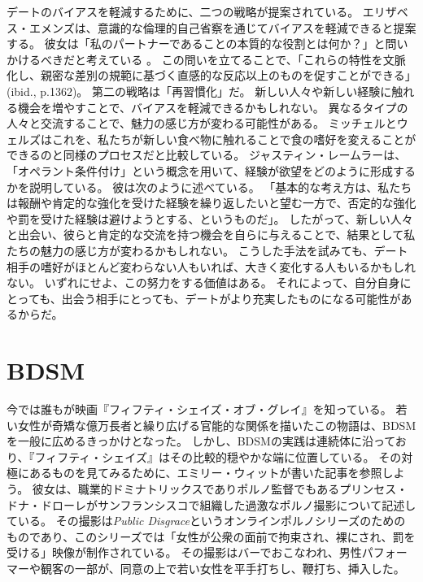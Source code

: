 \documentclass[paper=a4,book,openany]{jlreq}
\newcommand{\ig}[1]{}           %
\begin{document}
デートのバイアスを軽減するために、二つの戦略が提案されている。
エリザベス・エメンズは、意識的な倫理的自己省察を通じてバイアスを軽減できると提案する。
彼女は「私のパートナーであることの本質的な役割とは何か？」と問いかけるべきだと考えている \citep[p.1360]{emens09:_intim_discr}。
この問いを立てることで、「これらの特性を文脈化し、親密な差別の規範に基づく直感的な反応以上のものを促すことができる」(ibid., p.1362)。
第二の戦略は「再習慣化」だ。
新しい人々や新しい経験に触れる機会を増やすことで、バイアスを軽減できるかもしれない。
異なるタイプの人々と交流することで、魅力の感じ方が変わる可能性がある。
ミッチェル\ig{Megan Mitchell}とウェルズはこれを、私たちが新しい食べ物に触れることで食の嗜好を変えることができるのと同様のプロセスだと比較している\citep{mitchell18:_race_roman_attrac_datin}。
ジャスティン・レームラーは、「オペラント条件付け」という概念を用いて、経験が欲望をどのように形成するかを説明している。
彼は次のように述べている。
「基本的な考え方は、私たちは報酬や肯定的な強化を受けた経験を繰り返したいと望む一方で、否定的な強化や罰を受けた経験は避けようとする、というものだ」\citep{lehmiller19:_where_do_our_sexual_attrac_come_from}。
したがって、新しい人々と出会い、彼らと肯定的な交流を持つ機会を自らに与えることで、結果として私たちの魅力の感じ方が変わるかもしれない。
こうした手法を試みても、デート相手の嗜好がほとんど変わらない人もいれば、大きく変化する人もいるかもしれない。
いずれにせよ、この努力をする価値はある。
それによって、自分自身にとっても、出会う相手にとっても、デートがより充実したものになる可能性があるからだ。

\section{BDSM}

今では誰もが映画『フィフティ・シェイズ・オブ・グレイ』を知っている。
若い女性が奇矯な億万長者と繰り広げる官能的な関係を描いたこの物語は、BDSMを一般に広めるきっかけとなった。
しかし、BDSMの実践は連続体に沿っており、『フィフティ・シェイズ』はその比較的穏やかな端に位置している。
その対極にあるものを見てみるために、エミリー・ウィットが書いた記事を参照しよう。
彼女は、職業的ドミナトリックスでありポルノ監督でもあるプリンセス・ドナ・ドローレがサンフランシスコで組織した過激なポルノ撮影について記述している。
その撮影は\emph{Public Disgrace}というオンラインポルノシリーズのためのものであり、このシリーズでは「女性が公衆の面前で拘束され、裸にされ、罰を受ける」映像が制作されている。
その撮影はバーでおこなわれ、男性パフォーマーや観客の一部が、同意の上で若い女性を平手打ちし、鞭打ち、挿入した\citep{witt13:_what_do_you_desir}。
\end{document}
